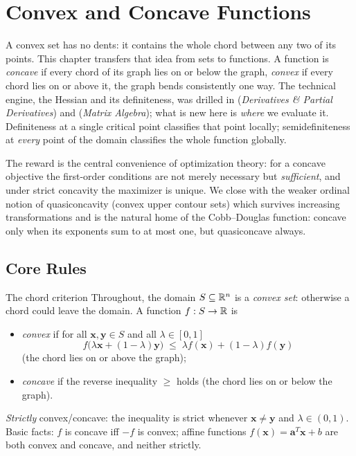 \chapter{Convex and Concave Functions}

A convex set has no dents: it contains the whole chord between any two of
its points. This chapter transfers that idea from sets to functions. A
function is \emph{concave} if every chord of its graph lies on or below the
graph, \emph{convex} if every chord lies on or above it, the graph bends
consistently one way. The technical engine, the Hessian and its
definiteness, was drilled in  (\emph{Derivatives \&
Partial Derivatives}) and  (\emph{Matrix Algebra}); what is new here is
\emph{where} we evaluate it. Definiteness at a single critical point
classifies that point locally; semidefiniteness at \emph{every} point of the
domain classifies the whole function globally.

The reward is the central convenience of optimization theory: for a concave
objective the first-order conditions are not merely necessary but
\emph{sufficient}, and under strict concavity the maximizer is unique. We
close with the weaker ordinal notion of quasiconcavity (convex upper
contour sets) which survives increasing transformations and is the
natural home of the Cobb--Douglas function: concave only when its exponents
sum to at most one, but quasiconcave always.

\section{Core Rules}

\begin{rulebox}{The chord criterion}
Throughout, the domain $S\subseteq\mathbb{R}^{n}$ is a \emph{convex set}:
otherwise a chord could leave the domain. A function $f:S\to\mathbb{R}$ is
\begin{itemize}[leftmargin=1.6em,itemsep=0.3ex]
  \item \emph{convex} if for all $\mathbf{x},\mathbf{y}\in S$
        and all $\lambda\in[0,1]$
        \[
          f\bigl(\lambda\mathbf{x}+(1-\lambda)\mathbf{y}\bigr)
          \;\le\; \lambda f(\mathbf{x})+(1-\lambda)f(\mathbf{y})
        \]
        (the chord lies on or above the graph);
  \item \emph{concave} if the reverse inequality $\ge$ holds
        (the chord lies on or below the graph).
\end{itemize}
\emph{Strictly} convex/concave: the inequality is strict whenever
$\mathbf{x}\neq\mathbf{y}$ and $\lambda\in(0,1)$. Basic facts: $f$ is
concave iff $-f$ is convex; affine functions
$f(\mathbf{x})=\mathbf{a}^{T}\mathbf{x}+b$ are both convex and concave, and
neither strictly.
\end{rulebox}

